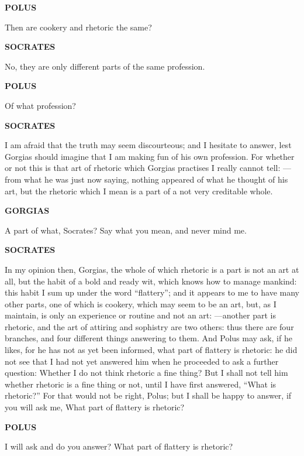 \documentclass[11pt,letter]{article}
\begin{document}
\par \textbf{POLUS}
\par   Then are cookery and rhetoric the same?

\par \textbf{SOCRATES}
\par   No, they are only different parts of the same profession.

\par \textbf{POLUS}
\par   Of what profession?

\par \textbf{SOCRATES}
\par   I am afraid that the truth may seem discourteous; and I hesitate to answer, lest Gorgias should imagine that I am making fun of his own profession. For whether or not this is that art of rhetoric which Gorgias practises I really cannot tell: —from what he was just now saying, nothing appeared of what he thought of his art, but the rhetoric which I mean is a part of a not very creditable whole.

\par \textbf{GORGIAS}
\par   A part of what, Socrates? Say what you mean, and never mind me.

\par \textbf{SOCRATES}
\par   In my opinion then, Gorgias, the whole of which rhetoric is a part is not an art at all, but the habit of a bold and ready wit, which knows how to manage mankind:  this habit I sum up under the word “flattery”; and it appears to me to have many other parts, one of which is cookery, which may seem to be an art, but, as I maintain, is only an experience or routine and not an art: —another part is rhetoric, and the art of attiring and sophistry are two others:  thus there are four branches, and four different things answering to them. And Polus may ask, if he likes, for he has not as yet been informed, what part of flattery is rhetoric:  he did not see that I had not yet answered him when he proceeded to ask a further question:  Whether I do not think rhetoric a fine thing? But I shall not tell him whether rhetoric is a fine thing or not, until I have first answered, “What is rhetoric?” For that would not be right, Polus; but I shall be happy to answer, if you will ask me, What part of flattery is rhetoric?

\par \textbf{POLUS}
\par   I will ask and do you answer? What part of flattery is rhetoric?
\end{document}
